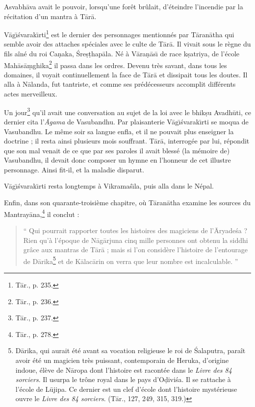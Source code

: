 \documentclass[a4paper, 11pt, oneside, french]{article}
\begin{document}
Asvabh\={a}va avait le pouvoir, lorsqu'une forêt brûlait, d'éteindre l'incendie par la récitation d'un mantra à T\={a}r\={a}.

V\={a}g\={\i}\'{s}varak\={\i}rti\footnote{T\={a}r., p. 235.} est le dernier des personnages mentionnés par T\={a}ran\={a}tha qui semble avoir des attaches spéciales avec le culte de T\={a}r\={a}. Il vivait sous le règne du fils aîné du roi Ca\d{n}aka, \'{S}re\d{s}\d{t}hap\={a}la. Né à V\={a}ra\d{n}\={a}s\={\i} de race k\d{s}atriya, de l'école Mah\={a}s\={a}\d{m}ghika\footnote{T\={a}r., p. 236.} il passa dans les ordres. Devenu très savant, dans tous les domaines, il voyait continuellement la face de T\={a}r\={a} et dissipait tous les doutes. Il alla à N\={a}landa, fut tantriste, et comme ses prédécesseurs accomplit différents actes merveilleux.

Un jour\footnote{T\={a}r., p. 237.} qu'il avait une conversation au sujet de la loi avec le bhik\d{s}u Avadh\={u}ti, ce dernier cita l'\emph{\={A}gama} de Vasubandhu. Par plaisanterie V\={a}g\={\i}\'{s}varak\={\i}rti se moqua de Vasubandhu. Le même soir sa langue enfla, et il ne pouvait plus enseigner la doctrine ; il resta ainsi plusieurs mois souffrant. T\={a}r\={a}, interrogée par lui, répondit que son mal venait de ce que par ses paroles il avait blessé (la mémoire de) Vasubandhu, il devait donc composer un hymne en l'honneur de cet illustre personnage. Ainsi fit-il, et la maladie disparut.

V\={a}g\={\i}\'{s}varak\={\i}rti resta longtemps à Vikrama\'{s}\={\i}la, puis alla dans le Népal.

Enfin, dans son quarante-troisième chapitre, où T\={a}ran\={a}tha examine les sources du Mantray\={a}na,\footnote{T\={a}r., p. 278.} il conclut :
\begin{quotation}
`` Qui pourrait rapporter toutes les histoires des magiciens de l'\={A}ryade\'{s}a ? Rien qu'à l'époque de N\={a}g\={a}rjuna cinq mille personnes ont obtenu la siddhi grâce aux mantras de T\={a}r\={a} ; mais si l'on considère l'histoire de l'entourage de D\={a}rika\footnote{D\={a}rika, qui aurait été avant sa vocation religieuse le roi de \'{S}alaputra, paraît avoir été un magicien très puissant, contemporain de Heruka, d'origine indoue, élève de N\={a}ropa dont l'histoire est racontée dans le \emph{Livre des 84 sorciers}. Il usurpa le trône royal dans le pays d'O\d{d}ivi\'{s}a. Il se rattache à l'école de L\={u}jipa. Ce dernier est un clef d'école dont l'histoire mystérieuse ouvre le \emph{Livre des 84 sorciers}. (T\={a}r., 127, 249, 315, 319.)} et de K\={a}lac\={a}rin on verra que leur nombre est incalculable. ''
\end{quotation}
\end{document}
